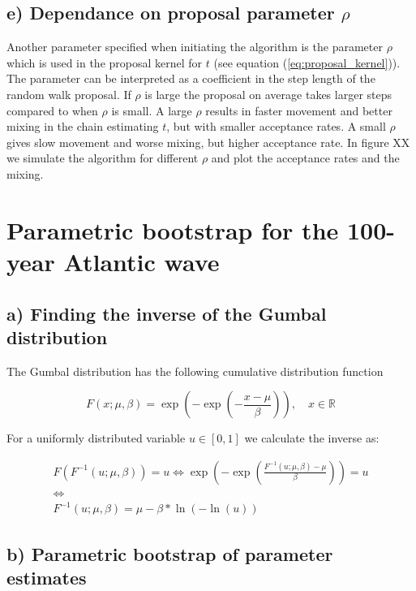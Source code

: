 \documentclass[a4paper]{article}
\begin{document}
\subsection*{e) Dependance on proposal parameter $\rho$}
Another parameter specified when initiating the algorithm is the parameter $\rho$ which is used in the proposal kernel for $t$ (see equation (\ref{eq:proposal_kernel})). The parameter can be interpreted as a coefficient in the step length of the random walk proposal. If $\rho$ is large the proposal on average takes larger steps compared to when $\rho$ is small. A large $\rho$ results in faster movement and better mixing in the chain estimating $t$, but with smaller acceptance rates. A small $\rho$ gives slow movement and worse mixing, but higher acceptance rate. In figure XX we simulate the algorithm for different $\rho$ and plot the acceptance rates and the mixing.

\newpage

\section{Parametric bootstrap for the 100-year Atlantic wave}

\subsection*{a) Finding the inverse of the Gumbal distribution}

The Gumbal distribution has the following cumulative distribution function

\begin{equation}
    F(x; \mu, \beta) = \exp\left(-\exp\left(-\frac{x-\mu}{\beta}\right)\right), \quad x \in \mathbb{R}
    \label{eq:gumbel}
\end{equation}

For a uniformly distributed variable $u \in [0,1]$ we calculate the inverse as:

\begin{equation}
    \label{eq:inv_gumbel}
    \begin{gathered}
        F(F^{-1}(u;\mu, \beta)) = u \iff \exp(-\exp(\frac{F^{-1}(u;\mu,\beta)-\mu}{\beta})) = u \\
        \iff \\
        F^{-1}(u; \mu, \beta) = \mu - \beta*\ln(-\ln(u)) 
    \end{gathered}
\end{equation}


\subsection*{b) Parametric bootstrap of parameter estimates}
\end{document}
